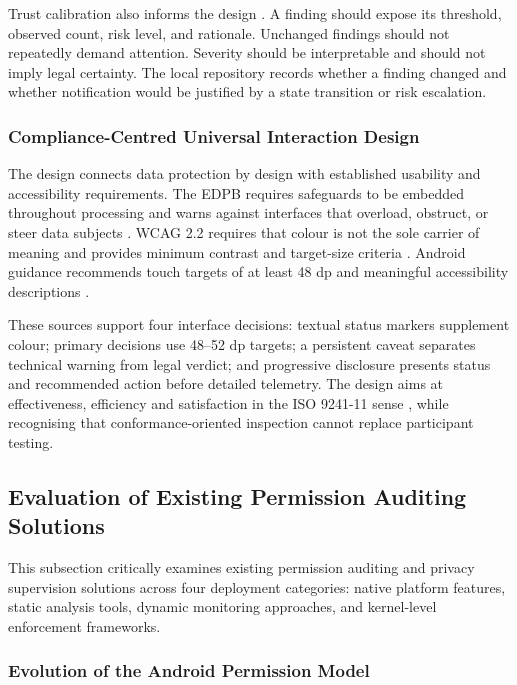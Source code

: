 Trust calibration also informs the design \cite{34}. A finding should expose its threshold, observed count, risk level, and rationale. Unchanged findings should not repeatedly demand attention. Severity should be interpretable and should not imply legal certainty. The local repository records whether a finding changed and whether notification would be justified by a state transition or risk escalation.

\subsubsection{Compliance-Centred Universal Interaction Design}

The design connects data protection by design with established usability and accessibility requirements. The EDPB requires safeguards to be embedded throughout processing and warns against interfaces that overload, obstruct, or steer data subjects \cite{edpb2019,edpb2022}. WCAG 2.2 requires that colour is not the sole carrier of meaning and provides minimum contrast and target-size criteria \cite{wcag22}. Android guidance recommends touch targets of at least 48 dp and meaningful accessibility descriptions \cite{androidaccess}.

These sources support four interface decisions: textual status markers supplement colour; primary decisions use 48--52 dp targets; a persistent caveat separates technical warning from legal verdict; and progressive disclosure presents status and recommended action before detailed telemetry. The design aims at effectiveness, efficiency and satisfaction in the ISO 9241-11 sense \cite{iso924111}, while recognising that conformance-oriented inspection cannot replace participant testing.

\subsection{Evaluation of Existing Permission Auditing Solutions}

This subsection critically examines existing permission auditing and privacy supervision solutions across four deployment categories: native platform features, static analysis tools, dynamic monitoring approaches, and kernel-level enforcement frameworks.

\subsubsection{Evolution of the Android Permission Model}


